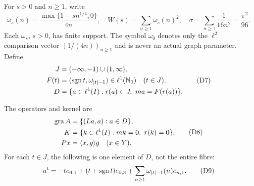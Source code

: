 For $s>0$ and $n\ge1$, write
\begin{equation}
\omega_s(n)=\frac{\max\{1-sn^{1/4},0\}}{4n},\quad
W(s)=\sum_{n\ge1}\omega_s(n)^2,\quad
\sigma=\sum_{n\ge1}\frac1{16n^2}=\frac{\pi^2}{96}.
\tag{D6}\label{eq:D6}
\end{equation}
Each $\omega_s$, $s>0$, has finite support. The symbol $\omega_0$ denotes only
the $\ell^2$ comparison vector $(1/(4n))_{n\ge1}$ and is never an actual
graph parameter. Define
\begin{equation}
\begin{aligned}
J&=(-\infty,-1)\cup(1,\infty),\\
F(t)&=(\operatorname{sgn} t,\omega_{|t|-1})\in\ell^1(\mathbb N_0)\quad(t\in J),\\
D&=\{a\in\ell^1(I):r(a)\in J,\ ma=F(r(a))\}.
\end{aligned}
\tag{D7}\label{eq:D7}
\end{equation}

The operators and kernel are
\begin{equation}
\begin{aligned}
\operatorname{gra} A&=\{(La,a):a\in D\},\\
K&=\{k\in\ell^1(I):mk=0,\ r(k)=0\},\\
Px&=\langle x,g\rangle g\quad(x\in Y).
\end{aligned}
\tag{D8}\label{eq:D8}
\end{equation}
For each $t\in J$, the following is one element of $D$, not the entire fibre:
\begin{equation}
a^t=-t e_{0,1}+(t+\operatorname{sgn} t)e_{0,3}
       +\sum_{n\ge1}\omega_{|t|-1}(n)e_{n,1}.
\tag{D9}\label{eq:D9}
\end{equation}



